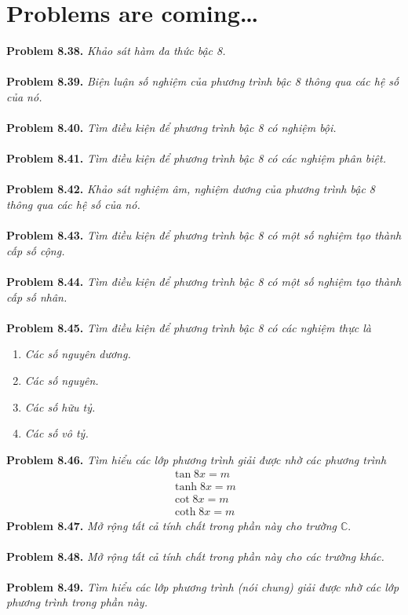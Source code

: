 \documentclass[a4paper,oneside]{book}
\numberwithin{equation}{chapter}
\begin{document}
\section{Problems are coming\ldots}
\textbf{Problem 8.38.} \textit{Khảo sát hàm đa thức bậc 8.}\\
\\
\textbf{Problem 8.39.} \textit{Biện luận số nghiệm của phương trình bậc 8 thông qua các hệ số của nó.}\\
\\
\textbf{Problem 8.40.} \textit{Tìm điều kiện để phương trình bậc 8 có nghiệm bội.}\\
\\
\textbf{Problem 8.41.} \textit{Tìm điều kiện để phương trình bậc 8 có các nghiệm phân biệt.}\\
\\
\textbf{Problem 8.42.} \textit{Khảo sát nghiệm âm, nghiệm dương của phương trình bậc 8 thông qua các hệ số của nó.}\\
\\
\textbf{Problem 8.43.} \textit{Tìm điều kiện để phương trình bậc 8 có một số nghiệm tạo thành cấp số cộng.}\\
\\
\textbf{Problem 8.44.} \textit{Tìm điều kiện để phương trình bậc 8 có một số nghiệm tạo thành cấp số nhân.}\\
\\
\textbf{Problem 8.45.} \textit{Tìm điều kiện để phương trình bậc 8 có các nghiệm thực là}
\begin{enumerate}
\item \textit{Các số nguyên dương.}
\item \textit{Các số nguyên.}
\item \textit{Các số hữu tỷ.}
\item \textit{Các số vô tỷ.}
\end{enumerate}
\textbf{Problem 8.46.} \textit{Tìm hiểu các lớp phương trình giải được nhờ các phương trình}
\begin{align}
\tan 8x = m\\
\tanh 8x = m\\
\cot 8x = m\\
\coth 8x = m
\end{align}
\textbf{Problem 8.47.} \textit{Mở rộng tất cả tính chất trong phần này cho trường $\mathbb{C}$}.\\
\\
\textbf{Problem 8.48.} \textit{Mở rộng tất cả tính chất trong phần này cho các trường khác.}\\
\\
\textbf{Problem 8.49.} \textit{Tìm hiểu các lớp phương trình (nói chung) giải được nhờ các lớp phương trình trong phần này.}
\end{document}
